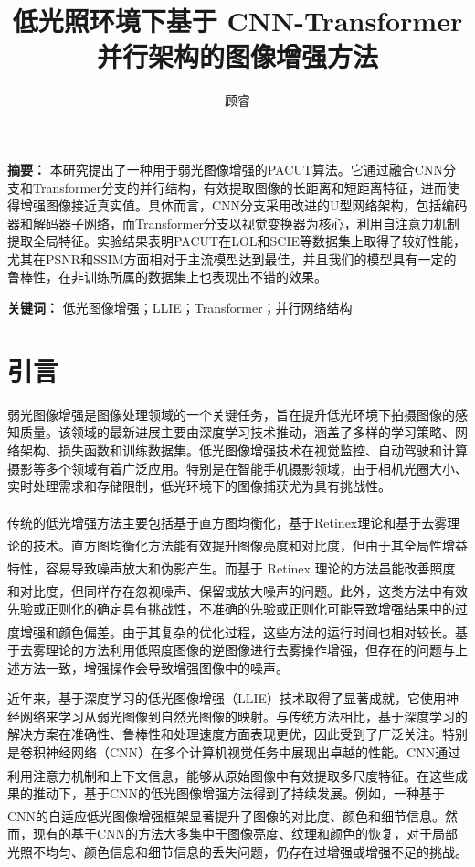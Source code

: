 \documentclass[a4paper]{ctexart}
\title{\heiti\zihao{3} 低光照环境下基于 CNN-Transformer 并行架构的图像增强方法}
\author[1]{\fangsong\zihao{5} 顾睿}
\affil[ ]{\songti\zihao{-5}（1. 兰州大学信息科学与工程学院，甘肃兰州 730000）}
\date{} %
\newcommand{\upcite}[1]{\rmfamily\textsuperscript{\textsuperscript{\cite{#1}}}}
\begin{document}
\maketitle
	 
{
\noindent\textbf{摘要：} 本研究提出了一种用于弱光图像增强的PACUT算法。它通过融合CNN分支和Transformer分支的并行结构，有效提取图像的长距离和短距离特征，进而使得增强图像接近真实值。具体而言，CNN分支采用改进的U型网络架构，包括编码器和解码器子网络，而Transformer分支以视觉变换器为核心，利用自注意力机制提取全局特征。实验结果表明PACUT在LOL和SCIE等数据集上取得了较好性能，尤其在PSNR和SSIM方面相对于主流模型达到最佳，并且我们的模型具有一定的鲁棒性，在非训练所属的数据集上也表现出不错的效果。

\setlength{\parskip}{0pt}

\noindent\textbf{关键词：} 低光图像增强；LLIE；Transformer；并行网络结构
}
	
\section{引言}
	
弱光图像增强是图像处理领域的一个关键任务，旨在提升低光环境下拍摄图像的感知质量。该领域的最新进展主要由深度学习技术推动，涵盖了多样的学习策略、网络架构、损失函数和训练数据集。低光图像增强技术在视觉监控、自动驾驶和计算摄影等多个领域有着广泛应用。特别是在智能手机摄影领域，由于相机光圈大小、实时处理需求和存储限制，低光环境下的图像捕获尤为具有挑战性。
	
传统的低光增强方法主要包括基于直方图均衡化\upcite{huang2012efficient, wang1999image}，基于Retinex理论\upcite{jobson1997properties, land1965retinex, land1977retinex}和基于去雾理论\upcite{kim2011single, li2015low}的技术。直方图均衡化方法能有效提升图像亮度和对比度，但由于其全局性增益特性，容易导致噪声放大和伪影\upcite{ji1994adaptive, tan2019exposure}产生。而基于 Retinex 理论的方法虽能改善照度和对比度，但同样存在忽视噪声、保留或放大噪声的问题\upcite{fu2016weighted}。此外，这类方法中有效先验或正则化的确定具有挑战性，不准确的先验或正则化可能导致增强结果中的过度增强和颜色偏差\upcite{tao2017llcnn, wang2019low}。由于其复杂的优化过程，这些方法的运行时间也相对较长。基于去雾理论的方法利用低照度图像的逆图像进行去雾操作增强，但存在的问题与上述方法一致，增强操作会导致增强图像中的噪声。
	
近年来，基于深度学习的低光图像增强（LLIE）技术取得了显著成就，它使用神经网络来学习从弱光图像到自然光图像的映射。与传统方法相比，基于深度学习的解决方案在准确性、鲁棒性和处理速度方面表现更优，因此受到了广泛关注。特别是卷积神经网络（CNN）在多个计算机视觉任务中展现出卓越的性能。CNN通过利用注意力机制和\upcite{yang2021locally, zhang2020attention}上下文信息，能够从原始图像中有效提取多尺度特征\upcite{li2018multi, zamir2020learning}。在这些成果的推动下，基于CNN的低光图像增强方法得到了持续发展。例如，一种基于CNN的自适应低光图像增强框架\upcite{li2020visual}显著提升了图像的对比度、颜色和细节信息。然而，现有的基于CNN的方法大多集中于图像亮度、纹理和颜色的恢复，对于局部光照不均匀、颜色信息和细节信息的丢失问题，仍存在过增强或增强不足的挑战。
\end{document}
